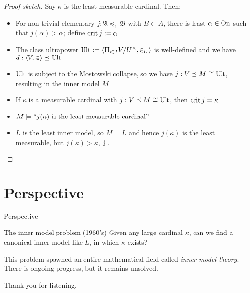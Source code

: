 \begin{frame}
	\begin{proof}[Proof sketch]
		Say $\kappa$ is the least measurable cardinal. \pause Then:
		\begin{itemize}
			\item For non-trivial elementary $j:\mathfrak{A}\preceq_1\mathfrak{B}$ with $B\subset A$, there is least $\alpha\in\operatorname{On}$ such that $j(\alpha)>\alpha$; define $\operatorname{crit} j:=\alpha$
			\pause\item The class ultrapower $\operatorname{Ult}:=\langle \Pi_{i\in I}V/U^\times,\in_U\rangle$ is well-defined and we have $d:\langle V,\in\rangle\preceq\operatorname{Ult}$
			\pause\item $\operatorname{Ult}$ is subject to the Mostowski collapse, so we have $j:V\preceq M\cong\operatorname{Ult}$, resulting in the inner model $M$
			\pause\item If $\kappa$ is a measurable cardinal with $j:V\preceq M\cong\operatorname{Ult}$, then $\operatorname{crit} j=\kappa$
			\pause\item $M\models``j(\kappa)\text{ is the least measurable cardinal}"$
			\pause\item $L$ is the least inner model, so $M=L$ and hence $j(\kappa)$ is the least measurable, but $j(\kappa)>\kappa$, $\operatorname{\lightning}$.
		\end{itemize}
	\end{proof}
\end{frame}


\section[Perspective]{Perspective}

\begin{frame}{Perspective}
	\begin{block}{The inner model problem (1960's)}
		Given any large cardinal $\kappa$, can we find a canonical inner model like $L$, in which $\kappa$ exists?
	\end{block}
	
	\vspace{20pt}
	
	\pause This problem spawned an entire mathematical field called \textit{inner model theory}. There is ongoing progress, but it remains unsolved.
\end{frame}

\begin{frame}
	\begin{center}
	\Large Thank you for listening.
	\end{center}
\end{frame}

